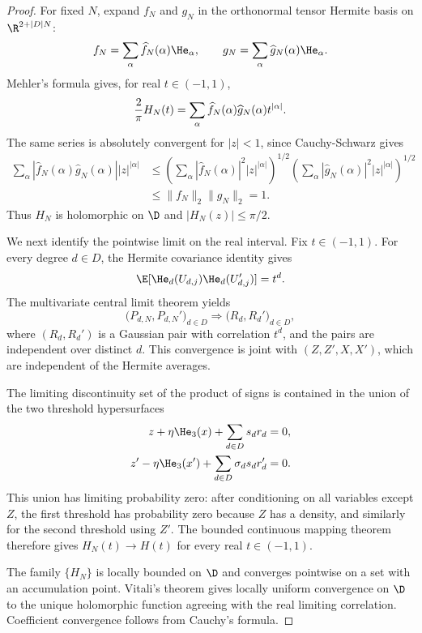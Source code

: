 \begin{proof}
For fixed $N$, expand $f_N$ and $g_N$ in the orthonormal tensor Hermite basis on $\R^{2+|D|N}$:
\[
  f_N=\sum_\alpha \widehat f_N(\alpha)\He_\alpha,
  \qquad
  g_N=\sum_\alpha \widehat g_N(\alpha)\He_\alpha.
\]
Mehler's formula gives, for real $t\in(-1,1)$,
\[
  {2\over\pi}H_N(t)=\sum_\alpha \widehat f_N(\alpha)\widehat g_N(\alpha)t^{|\alpha|}.
\]
The same series is absolutely convergent for $|z|<1$, since Cauchy-Schwarz gives
\begin{align*}
  \sum_\alpha |\widehat f_N(\alpha)\widehat g_N(\alpha)| |z|^{|\alpha|}
  &\le
  \left(\sum_\alpha |\widehat f_N(\alpha)|^2 |z|^{|\alpha|}\right)^{1/2}
  \left(\sum_\alpha |\widehat g_N(\alpha)|^2 |z|^{|\alpha|}\right)^{1/2}\\
  &\le \|f_N\|_2\|g_N\|_2=1.
\end{align*}
Thus $H_N$ is holomorphic on $\D$ and $|H_N(z)|\le \pi/2$.

We next identify the pointwise limit on the real interval.  Fix $t\in(-1,1)$.  For every degree $d\in D$, the Hermite covariance identity gives
\[
  \E[\He_d(U_{d,j})\He_d(U_{d,j}')]=t^d.
\]
The multivariate central limit theorem yields
\[
  \bigl(P_{d,N},P_{d,N}'\bigr)_{d\in D}
  \Rightarrow
  \bigl(R_d,R_d'\bigr)_{d\in D},
\]
where $(R_d,R_d')$ is a Gaussian pair with correlation $t^d$, and the pairs are independent over distinct $d$.  This convergence is joint with $(Z,Z',X,X')$, which are independent of the Hermite averages.

The limiting discontinuity set of the product of signs is contained in the union of the two threshold hypersurfaces
\begin{align*}
  z+\eta \He_3(x)+\sum_{d\in D}s_dr_d&=0,\\
  z'-\eta \He_3(x')+\sum_{d\in D}\sigma_ds_dr_d'&=0.
\end{align*}
This union has limiting probability zero: after conditioning on all variables except $Z$, the first threshold has probability zero because $Z$ has a density, and similarly for the second threshold using $Z'$.  The bounded continuous mapping theorem therefore gives $H_N(t)\to H(t)$ for every real $t\in(-1,1)$.

The family $\{H_N\}$ is locally bounded on $\D$ and converges pointwise on a set with an accumulation point.  Vitali's theorem gives locally uniform convergence on $\D$ to the unique holomorphic function agreeing with the real limiting correlation.  Coefficient convergence follows from Cauchy's formula.
\end{proof}


